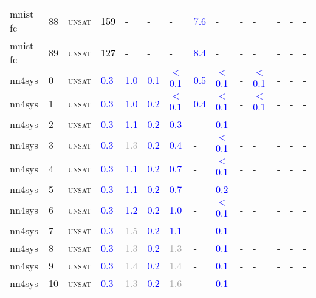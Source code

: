 \begin{center}
{\begin{longtable}{@{}llllllllllllll@{}}
mnist fc & 88 & \textsc{unsat} & \textcolor{black}{159} & - & - & - & \textcolor{blue}{7.6} & - & - & - & - & - & - \\
mnist fc & 89 & \textsc{unsat} & \textcolor{black}{127} & - & - & - & \textcolor{blue}{8.4} & - & - & - & - & - & - \\
nn4sys & 0 & \textsc{unsat} & \textcolor{blue}{0.3} & \textcolor{blue}{1.0} & \textcolor{blue}{0.1} & \textcolor{blue}{$<$0.1} & \textcolor{blue}{0.5} & \textcolor{blue}{$<$0.1} & - & \textcolor{blue}{$<$0.1} & - & - & - \\
nn4sys & 1 & \textsc{unsat} & \textcolor{blue}{0.3} & \textcolor{blue}{1.0} & \textcolor{blue}{0.2} & \textcolor{blue}{$<$0.1} & \textcolor{blue}{0.4} & \textcolor{blue}{$<$0.1} & - & \textcolor{blue}{$<$0.1} & - & - & - \\
nn4sys & 2 & \textsc{unsat} & \textcolor{blue}{0.3} & \textcolor{blue}{1.1} & \textcolor{blue}{0.2} & \textcolor{blue}{0.3} & - & \textcolor{blue}{0.1} & - & - & - & - & - \\
nn4sys & 3 & \textsc{unsat} & \textcolor{blue}{0.3} & \textcolor{darkgray}{1.3} & \textcolor{blue}{0.2} & \textcolor{blue}{0.4} & - & \textcolor{blue}{$<$0.1} & - & - & - & - & - \\
nn4sys & 4 & \textsc{unsat} & \textcolor{blue}{0.3} & \textcolor{blue}{1.1} & \textcolor{blue}{0.2} & \textcolor{blue}{0.7} & - & \textcolor{blue}{$<$0.1} & - & - & - & - & - \\
nn4sys & 5 & \textsc{unsat} & \textcolor{blue}{0.3} & \textcolor{blue}{1.1} & \textcolor{blue}{0.2} & \textcolor{blue}{0.7} & - & \textcolor{blue}{0.2} & - & - & - & - & - \\
nn4sys & 6 & \textsc{unsat} & \textcolor{blue}{0.3} & \textcolor{blue}{1.2} & \textcolor{blue}{0.2} & \textcolor{blue}{1.0} & - & \textcolor{blue}{$<$0.1} & - & - & - & - & - \\
nn4sys & 7 & \textsc{unsat} & \textcolor{blue}{0.3} & \textcolor{darkgray}{1.5} & \textcolor{blue}{0.2} & \textcolor{blue}{1.1} & - & \textcolor{blue}{0.1} & - & - & - & - & - \\
nn4sys & 8 & \textsc{unsat} & \textcolor{blue}{0.3} & \textcolor{darkgray}{1.3} & \textcolor{blue}{0.2} & \textcolor{darkgray}{1.3} & - & \textcolor{blue}{0.1} & - & - & - & - & - \\
nn4sys & 9 & \textsc{unsat} & \textcolor{blue}{0.3} & \textcolor{darkgray}{1.4} & \textcolor{blue}{0.2} & \textcolor{darkgray}{1.4} & - & \textcolor{blue}{0.1} & - & - & - & - & - \\
nn4sys & 10 & \textsc{unsat} & \textcolor{blue}{0.3} & \textcolor{darkgray}{1.3} & \textcolor{blue}{0.2} & \textcolor{darkgray}{1.6} & - & \textcolor{blue}{0.1} & - & - & - & - & - \\

\end{longtable}}
\end{center}
